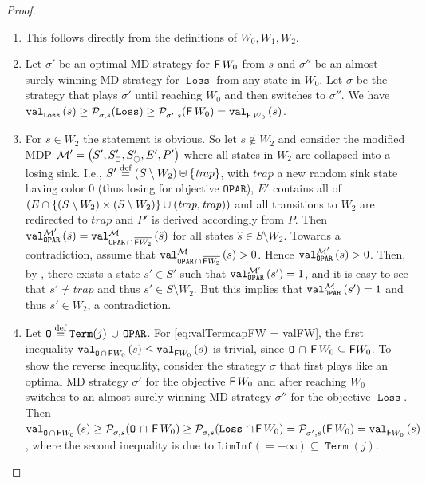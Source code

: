 \documentclass[a4paper,UKenglish,cleveref,autoref,thm-restate]{lipics-v2021}
\DeclareMathOperator{\Term}{\mathtt{Term}}
\DeclareMathOperator{\Loss}{\mathtt{Loss}}
\newcommand{\Oparity}{\mathtt{OPAR}}
\newcommand{\LimInf}[2]{\mathtt{LimInf}(#1 #2)}
\DeclarePairedDelimiter{\set}{\{}{\}}
\newcommand{\+}[1]{\mathbb{#1}}
\newcommand{\?}[1]{\mathcal{#1}}
\newcommand{\x}{\times}
\newcommand{\rsymbol}{\ocircle}
\newcommand{\zsymbol}{\Box}
\newcommand{\zstates}{\states_\zsymbol}
\newcommand{\rstates}{\states_\rsymbol}
\newcommand{\eqby}[2][=]{\stackrel{\text{{\tiny{#2}}}}{#1}}
\newcommand{\eqdef}{\eqby{def}}
\newcommand{\Prob}[2][]{\mathcal{P}^{#1}_{#2}}
\newcommand{\eventually}{{\sf F}}
\newcommand{\obj}{\mathtt{O}}
\newcommand{\lrc}[1]{\left(#1\right)}
\newcommand{\tuple}[1]{\lrc{#1}}
\newcommand{\mdp}{{\mathcal M}}
\newcommand{\mdptupleprime}{\tuple{\states',\zstates',\rstates',\transition',\probp'}}
\newcommand{\states}{S}
\newcommand{\s}{s}
\newcommand{\transition}{{E}}
\newcommand{\probp}{P}
\newcommand{\complementof}[1]{\overline{#1}}
\newcommand{\zstrat}{\sigma}
\begin{document}
\begin{proof}\,
\begin{enumerate}
\item
This follows directly from the definitions of $W_0,W_1,W_2$.
\item
  Let $\zstrat'$ be an optimal MD strategy for $\eventually\, {W_0}$ from $\s$ and
  $\zstrat''$ be an almost surely winning MD strategy for $\Loss$ from any state in $W_0$.
  Let $\zstrat$ be the strategy that plays $\zstrat'$ until reaching $W_0$ and
  then switches to $\zstrat''$.
  We have $\valueof[][\Loss]{\s} \ge \Prob{\zstrat,\s}(\Loss) \ge
  \Prob{\zstrat',\s}(\eventually\,W_0)
  = \valueof[][\eventually\, W_0]{\s}$.
\item
  For $\s \in W_2$ the statement is obvious.
  So let $\s \notin W_2$ and consider the modified
  MDP $\mdp' = \mdptupleprime$ where all states in $W_2$ are collapsed into a
  losing sink.
  I.e., $\states' \eqdef (\states \setminus W_2) \uplus \set*{\mathit{trap}}$,
  with $\mathit{trap}$ a new random sink state having color $0$
  (thus losing for objective $\Oparity$),
  $\transition'$ contains all of
  $\left(\transition \cap \set*{(\states \setminus W_2)\x(\states \setminus
      W_2)} \cup (\mathit{trap},\mathit{trap}) \right)$ and all transitions to
  $W_2$ are redirected to $\mathit{trap}$ and $\probp'$ is derived accordingly
  from $\probp$.
  Then $\valueof[\mdp'][\Oparity]{\hat{\s}} = \valueof[\mdp][\Oparity \,\cap \, \complementof{\eventually {W_2}}]{\hat{\s}}$
  for all states $\hat{\s} \in \states \setminus W_2$. 
  Towards a contradiction, assume that
  $\valueof[\mdp][\Oparity \,\cap \, \complementof{\eventually {W_2}}]{\s} > 0$.
  Hence $\valueof[\mdp'][\Oparity]{\s} > 0$.
  Then, by \cite[ Theorem~3.2]{GH2010}, there exists a state $\s' \in \states'$
  such that $\valueof[\mdp'][\Oparity]{\s'} = 1$,
  and it is easy to see that $\s' \neq \mathit{trap}$ and thus
  $\s' \in \states \setminus W_2$.
  But this implies that $\valueof[\mdp][\Oparity]{\s'} = 1$ and thus $\s' \in W_2$, a contradiction.
\item
  Let $\obj \eqdef \Term(j)\,\cup\, \Oparity$.
  For \cref{eq:valTermcapFW = valFW}, the first inequality
  $\valueof[][\obj\,\cap\, \eventually W_0]{\s} \le \valueof[][\eventually
  W_0]{\s}$ is trivial, since $\obj\, \cap\, \eventually\,W_0 \subseteq \eventually W_0$.
  To show the reverse inequality, consider the strategy $\zstrat$
  that first plays like an optimal MD strategy $\zstrat'$ for the objective
  $\eventually\,W_0$ and after reaching $W_0$ switches to an almost surely winning MD
  strategy $\zstrat''$ for the objective $\Loss$.
  Then
  $
  \valueof[][\obj\,\cap\,\eventually W_0]{\s}
  \ge
  \Prob[]{\zstrat,\s}(\obj\,\cap\,\eventually \,W_0)
  \ge
  \Prob[]{\zstrat,\s}(\Loss\,\cap\,\eventually \,W_0)
  =
  \Prob[]{\zstrat',\s}(\eventually \,W_0)
  =
  \valueof[][\eventually W_0]{\s}
  $,
  where the second inequality is due to $\LimInf{=}{-\infty}\subseteq \Term(j)$.


\end{enumerate}
\end{proof}
\end{document}
